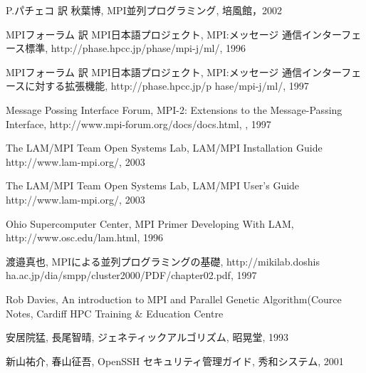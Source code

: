 \documentclass[a4paper,titlepage]{jreport}
\renewcommand{\bibname}{参考文献}
\begin{document}
\begin{thebibliography}{99}
\addcontentsline{toc}{chapter}{\bibname}

P.パチェコ 訳 秋葉博, MPI並列プログラミング, 培風館，2002

MPIフォーラム 訳 MPI日本語プロジェクト, MPI:メッセージ
通信インターフェース標準, http://phase.hpcc.jp/phase/mpi-j/ml/, 1996

MPIフォーラム 訳 MPI日本語プロジェクト, MPI:メッセージ
通信インターフェースに対する拡張機能, http://phase.hpcc.jp/p
hase/mpi-j/ml/, 1997

Message Possing Interface Forum, MPI-2: Extensions to the
Message-Passing Interface, http://www.mpi-forum.org/docs/docs.html,
, 1997

The LAM/MPI Team Open Systems Lab, LAM/MPI Installation Guide
http://www.lam-mpi.org/, 2003

The LAM/MPI Team Open Systems Lab, LAM/MPI User's Guide
http://www.lam-mpi.org/, 2003

Ohio Supercomputer Center, MPI Primer Developing With LAM,
http://www.osc.edu/lam.html, 1996

渡邉真也, MPIによる並列プログラミングの基礎,
 http://mikilab.doshis
ha.ac.jp/dia/smpp/cluster2000/PDF/chapter02.pdf, 1997

Rob Davies, An introduction to MPI and Parallel Genetic Algorithm(Cource Notes,
Cardiff HPC Training \& Education Centre

安居院猛, 長尾智晴, ジェネティックアルゴリズム,
昭晃堂, 1993

新山祐介, 春山征吾, OpenSSH セキュリティ管理ガイド,
秀和システム, 2001

\end{thebibliography}
\end{document}
